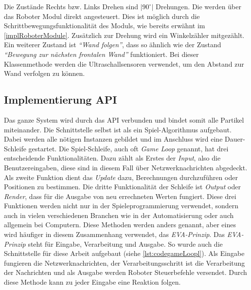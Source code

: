 Die Zustände Rechts bzw. Links Drehen sind $|90^{\circ}|$ Drehungen. Die werden über das Roboter Modul direkt angesteuert. Dies ist möglich durch die Schrittbewegungsfunktionalität des Moduls, wie bereits erwähnt im \autoref{implRoboterModule}. Zusätzlich zur Drehung wird ein Winkelzähler mitgezählt. Ein weiterer Zustand ist \textit{“Wand folgen”}, dass so ähnlich wie der Zustand \textit{“Bewegung zur nächsten frontalen Wand”} funktioniert. Bei dieser Klassenmethode werden die Ultraschallsensoren verwendet, um den Abstand zur Wand verfolgen zu können.

\subsection{Implementierung API}
Das ganze System wird durch das API verbunden und bindet somit alle Partikel miteinander. Die Schnittstelle selbst ist als ein Spiel-Algorithmus aufgebaut. Dabei werden alle nötigen Instanzen gebildet und im Anschluss wird eine Dauer-Schleife gestartet. Die Spiel-Schleife, auch oft \textit{Game Loop} genannt, hat drei entscheidende Funktionalitäten. Dazu zählt als Erstes der \textit{Input}, also die Benutzereingaben, diese sind in diesem Fall über Netzwerknachrichten abgedeckt. Als zweite Funktion dient das \textit{Update} dazu, Berechnungen durchzuführen oder Positionen zu bestimmen. Die dritte Funktionalität der Schleife ist \textit{Output} oder \textit{Render}, dass für die Ausgabe von neu errechneten Werten fungiert. Diese drei Funktionen werden nicht nur in der Spieleprogrammierung verwendet, sondern auch in vielen verschiedenen Branchen wie in der Automatisierung oder auch allgemein bei Computern. Diese Methoden werden anders genannt, aber eines wird häufiger in diesem Zusammenhang verwendet, das \textit{EVA-Prinzip}. Das \textit{EVA-Prinzip} steht für Eingabe, Verarbeitung und Ausgabe. So wurde auch die Schnittstelle für diese Arbeit aufgebaut (siehe \autoref{lst:codegameLoopl}). Als Eingabe fungieren die Netzwerknachrichten, der Verarbeitungsschritt ist die Verarbeitung der Nachrichten und als Ausgabe werden Roboter Steuerbefehle versendet. Durch diese Methode kann zu jeder Eingabe eine Reaktion folgen.



 
